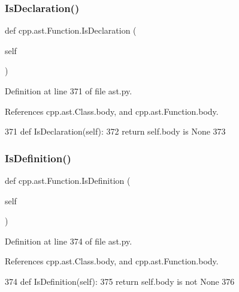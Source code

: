 \subsubsection{\texorpdfstring{Is\+Declaration()}{IsDeclaration()}}
{\footnotesize\ttfamily def cpp.\+ast.\+Function.\+Is\+Declaration (\begin{DoxyParamCaption}\item[{}]{self }\end{DoxyParamCaption})}



Definition at line 371 of file ast.\+py.



References cpp.\+ast.\+Class.\+body, and cpp.\+ast.\+Function.\+body.


\begin{DoxyCode}
371     \textcolor{keyword}{def }IsDeclaration(self):
372         \textcolor{keywordflow}{return} self.body \textcolor{keywordflow}{is} \textcolor{keywordtype}{None}
373 
\end{DoxyCode}
\mbox{\label{classcpp_1_1ast_1_1Function_ad5d96144bd8418ac72332bffb21ea86f}} 
\subsubsection{\texorpdfstring{Is\+Definition()}{IsDefinition()}}
{\footnotesize\ttfamily def cpp.\+ast.\+Function.\+Is\+Definition (\begin{DoxyParamCaption}\item[{}]{self }\end{DoxyParamCaption})}



Definition at line 374 of file ast.\+py.



References cpp.\+ast.\+Class.\+body, and cpp.\+ast.\+Function.\+body.


\begin{DoxyCode}
374     \textcolor{keyword}{def }IsDefinition(self):
375         \textcolor{keywordflow}{return} self.body \textcolor{keywordflow}{is} \textcolor{keywordflow}{not} \textcolor{keywordtype}{None}
376 
\end{DoxyCode}
\mbox{\label{classcpp_1_1ast_1_1Function_a85a073cd69116bc6191f379d69d10d72}} 
